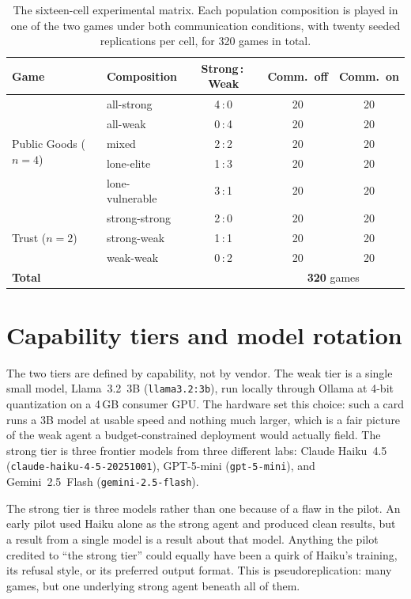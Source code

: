 \begin{table}[t]
\centering
\caption{The sixteen-cell experimental matrix. Each population composition is played in one
of the two games under both communication conditions, with twenty seeded replications per
cell, for 320 games in total.}
\label{tab:matrix}
\begin{tabular}{llccc}
\toprule
Game & Composition & Strong\,:\,Weak & Comm.\ off & Comm.\ on \\
\midrule
\multirow{5}{*}{Public Goods ($n=4$)}
  & all-strong      & 4\,:\,0 & 20 & 20 \\
  & all-weak        & 0\,:\,4 & 20 & 20 \\
  & mixed           & 2\,:\,2 & 20 & 20 \\
  & lone-elite      & 1\,:\,3 & 20 & 20 \\
  & lone-vulnerable & 3\,:\,1 & 20 & 20 \\
\midrule
\multirow{3}{*}{Trust ($n=2$)}
  & strong-strong   & 2\,:\,0 & 20 & 20 \\
  & strong-weak     & 1\,:\,1 & 20 & 20 \\
  & weak-weak       & 0\,:\,2 & 20 & 20 \\
\midrule
\multicolumn{3}{l}{\textbf{Total}} & \multicolumn{2}{c}{\textbf{320} games} \\
\bottomrule
\end{tabular}
\end{table}

\section{Capability tiers and model rotation}
\label{sec:tiers}

The two tiers are defined by capability, not by vendor. The weak tier is a single small
model, Llama~3.2~3B (\texttt{llama3.2:3b}), run locally through Ollama at 4-bit
quantization on a 4\,GB consumer GPU. The hardware set this choice: such a card runs a 3B
model at usable speed and nothing much larger, which is a fair picture of the weak agent a
budget-constrained deployment would actually field. The strong tier is three frontier
models from three different labs: Claude Haiku~4.5 (\texttt{claude-haiku-4-5-20251001}),
GPT-5-mini (\texttt{gpt-5-mini}), and Gemini~2.5~Flash (\texttt{gemini-2.5-flash}).

The strong tier is three models rather than one because of a flaw in the pilot. An early
pilot used Haiku alone as the strong agent and produced clean results, but a result from a
single model is a result about that model. Anything the pilot credited to ``the strong
tier'' could equally have been a quirk of Haiku's training, its refusal style, or its
preferred output format. This is pseudoreplication: many games, but one underlying strong
agent beneath all of them.

